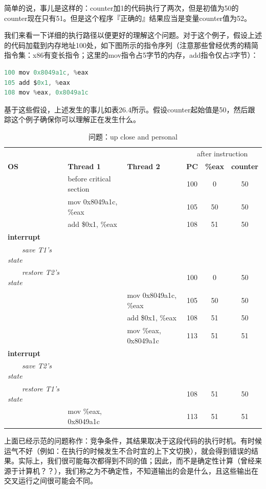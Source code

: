 简单的说，事儿是这样的：counter加1的代码执行了两次，但是初值为50的counter现在只有51。但是这个程序『正确的』结果应当是变量counter值为52。

我们来看一下详细的执行路径以便更好的理解这个问题。对于这个例子，假设上述的代码加载到内存地址100处，如下图所示的指令序列（注意那些曾经优秀的精简指令集：x86有变长指令；这里的mov指令占5字节的内存，add指令仅占3字节）：
\begin{lstlisting}[language=C]
100 mov 0x8049a1c, %eax
105 add $0x1, %eax
108 mov %eax, 0x8049a1c
\end{lstlisting}
基于这些假设，上述发生的事儿如表26.4所示。假设counter起始值是50，然后跟踪这个例子确保你可以理解正在发生什么。
\begin{table}[h]
{\footnotesize
\begin{tabular}{p{3cm} p{3cm} p{3cm} c c c}
 & & & \multicolumn{3}{c|}{after instruction} \\
\textbf{OS}&\textbf{Thread 1}&\textbf{Thread 2} & \textbf{PC}  & \textbf{\%eax} & \textbf{counter}\\
\midrule[1.1pt]
 & before critical section &  & 100 & 0 & 50 \\
 & mov 0x8049a1c, \%eax  &  & 105 & 50 & 50\\
 & add \$0x1, \%eax &  & 108 & 51 & 50 \\
 \textbf{interrupt} & & & & & \\
 ~~~~\textsl{save T1's state} & & & & & \\
 ~~~~\textsl{restore T2's state} & & & 100 & 0 & 50 \\
  & & mov 0x8049a1c, \%eax & 105 & 50 & 50 \\
  & & add \$0x1, \%eax & 108 & 51 & 50 \\
  & & mov \%eax, 0x8049a1c & 113 & 51 & 51 \\
\textbf{interrupt} & & & & & \\
 ~~~~\textsl{save T2's state} & & & & & \\
 ~~~~\textsl{restore T1's state} & & & 108 & 51 & 50 \\
  & mov \%eax, 0x8049a1c & & 113 & 51 & 51 \\
\end{tabular}}
\caption{问题：up close and personal}\color{black}\label{tab26-1}
\end{table}

上面已经示范的问题称作：竞争条件，其结果取决于这段代码的执行时机。有时候运气不好（例如：在执行的时候发生不合时宜的上下文切换），就会得到错误的结果。实际上，我们很可能每次都得到不同的值；因此，而不是确定性计算（曾经来源于计算机？？），我们称之为不确定性，不知道输出的会是什么，且这些输出在交叉运行之间很可能会不同。

